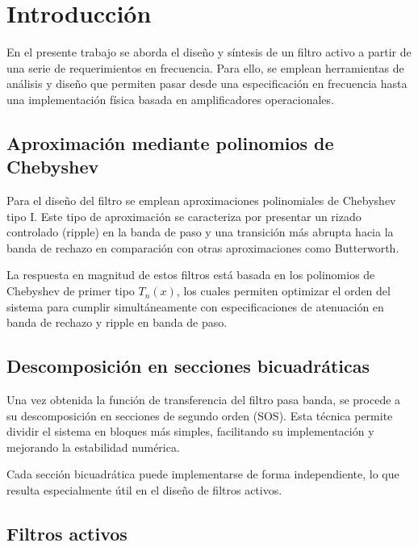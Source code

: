 \documentclass[12pt,a4paper]{article}
\begin{document}


\tableofcontents
\listoffigures
\newpage


\section{Introducción}

En el presente trabajo se aborda el diseño y síntesis de un filtro activo a partir de una serie de requerimientos en frecuencia. Para ello, se emplean herramientas de análisis y diseño que permiten pasar desde una especificación en frecuencia hasta una implementación física basada en amplificadores operacionales.

\subsection{Aproximación mediante polinomios de Chebyshev}

Para el diseño del filtro se emplean aproximaciones polinomiales de Chebyshev tipo I. Este tipo de aproximación se caracteriza por presentar un rizado controlado (ripple) en la banda de paso y una transición más abrupta hacia la banda de rechazo en comparación con otras aproximaciones como Butterworth.

La respuesta en magnitud de estos filtros está basada en los polinomios de Chebyshev de primer tipo \(T_n(x)\), los cuales permiten optimizar el orden del sistema para cumplir simultáneamente con especificaciones de atenuación en banda de rechazo y ripple en banda de paso.

\subsection{Descomposición en secciones bicuadráticas}

Una vez obtenida la función de transferencia del filtro pasa banda, se procede a su descomposición en secciones de segundo orden (SOS). Esta técnica permite dividir el sistema en bloques más simples, facilitando su implementación y mejorando la estabilidad numérica.

Cada sección bicuadrática puede implementarse de forma independiente, lo que resulta especialmente útil en el diseño de filtros activos.

\subsection{Filtros activos}
\end{document}
